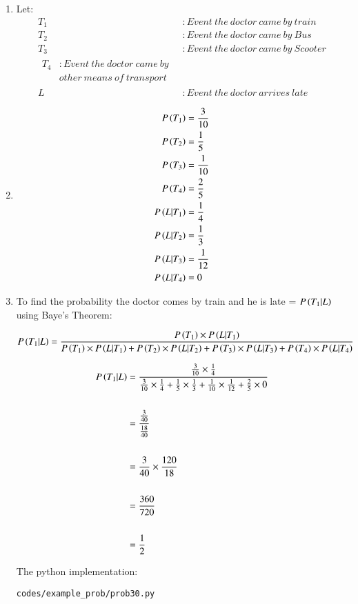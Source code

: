 \renewcommand{\theequation}{\theenumi}
\begin{enumerate}

\item Let: 
\begin{align*}
T_{1} &: Event\ the\  doctor\  came\  by\  train\\
T_{2} &: Event\  the\  doctor\  came\  by\  Bus\\
T_{3} &: Event\  the\  doctor\  came\  by\  Scooter\\
\begin{split}
T_{4} &: Event\  the\  doctor\  came\  by\  \\ 
      &other\  means\  of\  transport
\end{split}\\ 
L &: Event\ the\ doctor\ arrives\ late
\end{align*}
 
\item 
\begin{align*}
P\left(T_{1}\right) &= \frac{3}{10}\\
P\left(T_{2}\right) &= \frac{1}{5}\\
P\left(T_{3}\right) &= \frac{1}{10}\\
P\left(T_{4}\right) &= \frac{2}{5}\\
P\left(L|T_{1}\right) &= \frac{1}{4}\\
P\left(L|T_{2}\right) &= \frac{1}{3}\\
P\left(L|T_{3}\right) &= \frac{1}{12}\\
P\left(L|T_{4}\right) &= 0
\end{align*} 

\item To find the probability the doctor comes by train and he is late = $P\left(T_1|L\right)$ using Baye's Theorem:

\begin{tiny}
\begin{align*}
P\left(T_{1}|L\right) &= \frac{P\left(T_1\right) \times P\left(L|T_1\right)}{ P\left(T_1\right) \times P\left(L|T_1\right) + P\left(T_2\right) \times P\left(L|T_2\right) + P\left(T_3\right) \times P\left(L|T_3\right) + P\left(T_4\right) \times P\left(L|T_4\right) } 
\end{align*}
\end{tiny}

\begin{align*}
P\left(T_{1}|L\right) &= \frac{ \frac{3}{10} \times \frac{1}{4} }{ \frac{3}{10} \times \frac{1}{4} + \frac{1}{5} \times \frac{1}{3} + \frac{1}{10} \times \frac{1}{12} + \frac{2}{5} \times 0 } \\\\
&= \frac{\frac{3}{40}}{\frac{18}{40}}\\\\
&= \frac{3}{40} \times \frac{120}{18}\\\\
&= \frac{360}{720}\\\\
&= \frac{1}{2}
\end{align*}

\newpage
The python implementation:
\begin{lstlisting}
codes/example_prob/prob30.py
\end{lstlisting}

\end{enumerate}
